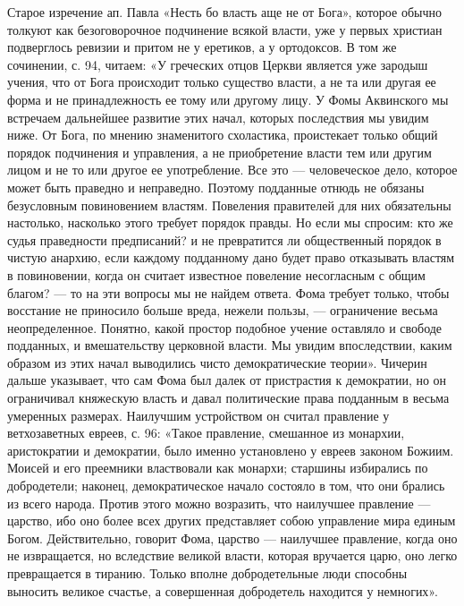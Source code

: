 Старое изречение ап.  Павла «Несть бо власть аще не  от Бога», которое
обычно  толкуют как  безоговорочное  подчинение всякой  власти, уже  у
первых  христиан подверглось  ревизии  и  притом не  у  еретиков, а  у
ортодоксов.  В том  же сочинении,  с. 94,  читаем: «У  греческих отцов
Церкви  является уже  зародыш учения,  что от  Бога происходит  только
существо власти,  а не та или  другая ее форма и  не принадлежность ее
тому  или другому  лицу.  У Фомы  Аквинского  мы встречаем  дальнейшее
развитие  этих начал,  которых последствия  мы увидим  ниже. От  Бога,
по  мнению знаменитого  схоластика, проистекает  только общий  порядок
подчинения и управления, а не приобретение власти тем или другим лицом
и не  то или другое  ее употребление.  Все это ---  человеческое дело,
которое может быть праведно и  неправедно. Поэтому подданные отнюдь не
обязаны  безусловным повиновением  властям.  Повеления правителей  для
них  обязательны настолько,  насколько этого  требует порядок  правды.
Но  если  мы спросим:  кто  же  судья  праведности предписаний?  и  не
превратится  ли общественный  порядок в  чистую анархию,  если каждому
подданному дано  будет право  отказывать властям в  повиновении, когда
он  считает  известное  повеление  несогласным  с  общим  благом?  ---
то  на  эти  вопросы  мы   не  найдем  ответа.  Фома  требует  только,
чтобы  восстание  не  приносило   больше  вреда,  нежели  пользы,  ---
ограничение  весьма неопределенное.  Понятно,  какой простор  подобное
учение  оставляло  и  свободе  подданных,  и  вмешательству  церковной
власти. Мы увидим впоследствии, каким образом из этих начал выводились
чисто демократические теории». Чичерин  дальше указывает, что сам Фома
был далек  от пристрастия  к демократии,  но он  ограничивал княжескую
власть  и  давал  политические  права  подданным  в  весьма  умеренных
размерах. Наилучшим  устройством он  считал правление  у ветхозаветных
евреев, с. 96: «Такое правление, смешанное из монархии, аристократии и
демократии, было  именно установлено  у евреев законом  Божиим. Моисей
и  его  преемники  властвовали  как монархи;  старшины  избирались  по
добродетели; наконец,  демократическое начало состояло в  том, что они
брались из всего  народа. Против этого можно  возразить, что наилучшее
правление ---  царство, ибо оно  более всех других  представляет собою
управление мира единым Богом. Действительно, говорит Фома, царство ---
наилучшее правление,  когда оно не извращается,  но вследствие великой
власти,  которая вручается  царю,  оно легко  превращается в  тиранию.
Только вполне добродетельные люди способны выносить великое счастье, а
совершенная добродетель находится у немногих».

